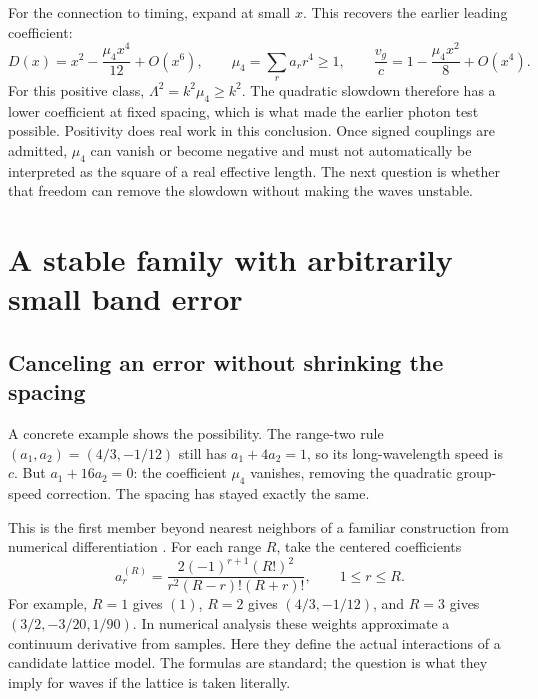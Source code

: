 \documentclass[11pt]{article}
\begin{document}
For the connection to timing, expand at small $x$. This recovers the earlier leading coefficient:
\begin{equation}
 D(x)=x^2-\frac{\mu_4x^4}{12}+O(x^6),\qquad
 \mu_4=\sum_r a_r r^4\geq1,
 \qquad \frac{v_g}{c}=1-\frac{\mu_4x^2}{8}+O(x^4).
\end{equation}
For this positive class, $\Lambda^2=k^2\mu_4\geq k^2$. The quadratic slowdown therefore has a lower coefficient at fixed spacing, which is what made the earlier photon test possible. Positivity does real work in this conclusion. Once signed couplings are admitted, $\mu_4$ can vanish or become negative and must not automatically be interpreted as the square of a real effective length. The next question is whether that freedom can remove the slowdown without making the waves unstable.

\section{A stable family with arbitrarily small band error}
\subsection{Canceling an error without shrinking the spacing}
A concrete example shows the possibility. The range-two rule $(a_1,a_2)=(4/3,-1/12)$ still has $a_1+4a_2=1$, so its long-wavelength speed is $c$. But $a_1+16a_2=0$: the coefficient $\mu_4$ vanishes, removing the quadratic group-speed correction. The spacing has stayed exactly the same.

This is the first member beyond nearest neighbors of a familiar construction from numerical differentiation \cite{nist,fornberg}. For each range $R$, take the centered coefficients
\begin{equation}\label{centered}
 a_r^{(R)}=\frac{2(-1)^{r+1}(R!)^2}{r^2(R-r)!(R+r)!},\qquad 1\leq r\leq R.
\end{equation}
For example, $R=1$ gives $(1)$, $R=2$ gives $(4/3,-1/12)$, and $R=3$ gives $(3/2,-3/20,1/90)$. In numerical analysis these weights approximate a continuum derivative from samples. Here they define the actual interactions of a candidate lattice model. The formulas are standard; the question is what they imply for waves if the lattice is taken literally.

\end{document}
